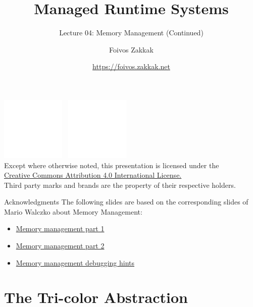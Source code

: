 \documentclass[
14pt,
aspectratio=169,
usenames,
dvipsnames,
x11names]{beamer}
\title{Managed Runtime Systems}
\subtitle{Lecture 04: Memory Management (Continued)}
\author[\url{https://foivos.zakkak.net}]{Foivos Zakkak}
\date{\url{https://foivos.zakkak.net}}
\begin{document}


\begin{frame}[plain]
  \titlepage
  \centering
  \includegraphics[height=.75cm]{cc}~
  \includegraphics[height=.75cm]{by}\\[1em]
  \scriptsize{Except where otherwise noted, this presentation is licensed under the\\
    \href{http://creativecommons.org/licenses/by/4.0/}%
    {Creative Commons Attribution 4.0 International License.}\\[1ex]
    Third party marks and brands are the property of their respective
    holders.}
\end{frame}


\begin{frame}{Acknowledgments}
  The following slides are based on the corresponding slides of Mario Walczko about Memory Management:

  \begin{itemize}
  \item \href{https://www.dropbox.com/s/bnwq1q677spkglp/7\%20Memory\%20management.pdf}{Memory management part 1}
  \item \href{https://www.dropbox.com/s/gxsuu4uqbgwo88f/7B\%20Memory\%20Management\%2C\%20part\%202.pdf}{Memory management part 2}
  \item \href{https://www.dropbox.com/s/f0lwnc9zjtw8dxy/7C\%20Debugging\%20hints.pdf}{Memory management debugging hints}
\end{itemize}
\end{frame}

\section{The Tri-color Abstraction}
\end{document}
